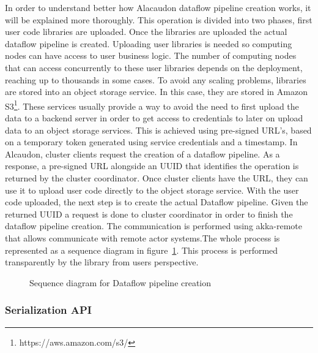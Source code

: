 In order to understand better how Alacaudon dataflow pipeline creation works, it
will be explained more thoroughly. This operation is divided into two phases,
first user code libraries are uploaded. Once the libraries are uploaded the
actual dataflow pipeline is created. Uploading user libraries is needed so
computing nodes can have access to user business logic. The number of computing nodes that
can access concurrently to these user libraries depends on the deployment,
reaching up to thousands in some cases. To avoid any scaling problems, libraries
are stored into an object storage service. In this case, they are stored in
Amazon S3\footnote{https://aws.amazon.com/s3/}. These services usually provide a
way to avoid the need to first upload the data to a backend server in order to
get access to credentials to later on upload data to an object storage services.
This is achieved using pre-signed URL's, based on a temporary token generated
using service credentials and a timestamp. In Alcaudon, cluster clients
request the creation of a dataflow pipeline. As a response, a pre-signed URL
alongside an UUID that identifies the operation is returned by the cluster
coordinator. Once cluster clients have the URL, they can use it to upload user
code directly to the object storage service. With the user code uploaded, the
next step is to create the actual Dataflow pipeline. Given the returned UUID a
request is done to cluster coordinator in order to finish the dataflow pipeline
creation. The communication is performed using akka-remote that allows
communicate with remote actor systems.The whole process is represented as a
sequence diagram in figure~\ref{fig:pipelinecreation}. This process is performed
transparently by the library from users perspective.

\begin{figure}[!h]
  \centering
  \scalebox{0.6}{
    
  }
\caption{Sequence diagram for Dataflow pipeline creation}
\label{fig:pipelinecreation}
\end{figure}

\subsubsection{Serialization API}

